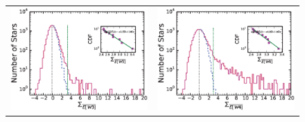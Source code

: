 \begin{figure}
\centering
\begin{tabular}{cc}
\includegraphics[scale=0.4]{Ch4/W3Joint_colordist_bgt5}&
\includegraphics[scale=0.4]{Ch4/W4_All3_Joint_colordist_bgt5}
\end{tabular}

\end{figure}
